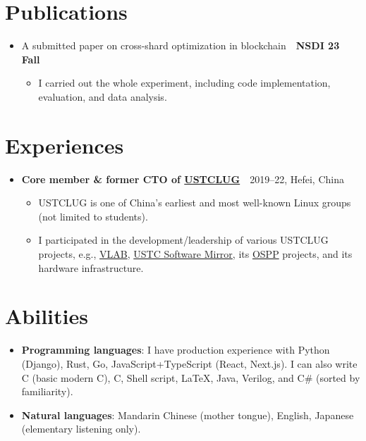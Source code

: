 \documentclass{article}
\newcommand{\Cpp}{C\nolinebreak[4]\hspace{-.05em}\raisebox{.4ex}{\tiny\bf ++}}
\newcommand{\Csharp}{C{\fontfaceLiberationSerif\#}}
\begin{document}
\section*{Publications}
\begin{itemize}[parsep=0.1cm,leftmargin=0.4cm]
  \item A submitted paper on cross-shard optimization in blockchain\ \dotfill\ \textbf{NSDI {\textquotesingle}23 Fall}
  \begin{itemize}[itemsep=0cm,parsep=0cm,topsep=0cm,leftmargin=0.25cm,label=]
    \item I carried out the whole experiment, including code implementation, evaluation, and data analysis.
  \end{itemize}
\end{itemize}

\section*{Experiences}
\begin{itemize}[parsep=0.1cm,leftmargin=0.4cm]
  \item \textbf{Core member \& former CTO of \href{https://lug.ustc.edu.cn/}{USTCLUG}}\ \dotfill\ 2019--22, Hefei, China
    \begin{itemize}[itemsep=0cm,parsep=0cm,topsep=0cm,leftmargin=0.25cm,label=]
      \item USTCLUG is one of China's earliest and most well-known Linux groups (not limited to students).
      \item I participated in the development/leadership of various USTCLUG projects, e.g., \href{https://vlab.ustc.edu.cn/}{VLAB}, \href{https://mirrors.ustc.edu.cn/}{USTC Software Mirror}, its \href{https://summer-ospp.ac.cn/}{OSPP} projects, and its hardware infrastructure.
    \end{itemize}
\end{itemize}

\section*{Abilities}
\begin{itemize}[parsep=0.1cm,leftmargin=0.4cm]
  \item \textbf{Programming languages}:
    I have production experience with Python (Django), Rust, Go, JavaScript+TypeScript (React, Next.js).
    I can also write \Cpp{} (basic modern \Cpp), C, Shell script, \LaTeX, Java, Verilog, and \Csharp{} (sorted by familiarity).
  \item \textbf{Natural languages}: Mandarin Chinese (mother tongue), English, Japanese (elementary listening only).
\end{itemize}

\blindtext[2]{}
\end{document}
